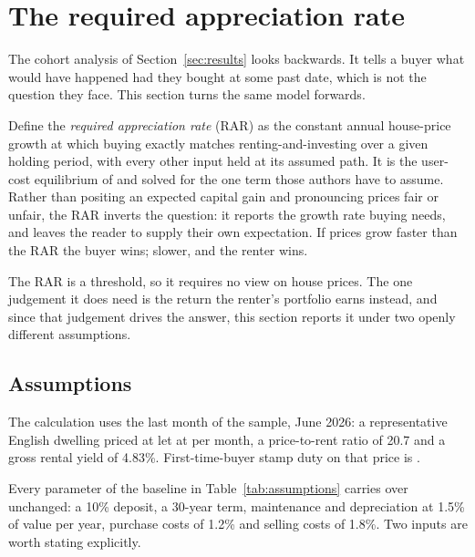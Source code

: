 
\section{The required appreciation rate}
\label{sec:rar}

The cohort analysis of Section~\ref{sec:results} looks backwards. It tells a buyer what would have happened had they bought at some past date, which is not the question they face. This section turns the same model forwards.

Define the \emph{required appreciation rate} (RAR) as the constant annual house-price growth at which buying exactly matches renting-and-investing over a given holding period, with every other input held at its assumed path. It is the user-cost equilibrium of \textcite{poterba1984} and \textcite{himmelberg2005} solved for the one term those authors have to assume. Rather than positing an expected capital gain and pronouncing prices fair or unfair, the RAR inverts the question: it reports the growth rate buying needs, and leaves the reader to supply their own expectation. If prices grow faster than the RAR the buyer wins; slower, and the renter wins.

The RAR is a threshold, so it requires no view on house prices. The one judgement it does need is the return the renter's portfolio earns instead, and since that judgement drives the answer, this section reports it under two openly different assumptions.

\subsection{Assumptions}
\label{sec:rar_assumptions}

The calculation uses the last month of the sample, June 2026: a representative English dwelling priced at  let at  per month, a price-to-rent ratio of 20.7 and a gross rental yield of 4.83\%. First-time-buyer stamp duty on that price is .

Every parameter of the baseline in Table~\ref{tab:assumptions} carries over unchanged: a 10\% deposit, a 30-year term, maintenance and depreciation at 1.5\% of value per year, purchase costs of 1.2\% and selling costs of 1.8\%. Two inputs are worth stating explicitly.

